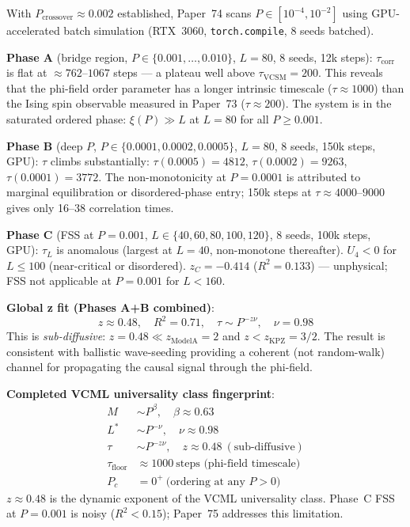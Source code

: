 \documentclass[11pt]{article}
\begin{document}
With $P_\mathrm{crossover}\approx0.002$ established, Paper~74 scans $P\in[10^{-4},10^{-2}]$
using GPU-accelerated batch simulation (RTX~3060, \texttt{torch.compile}, 8 seeds batched).

\textbf{Phase A} (bridge region, $P\in\{0.001,\ldots,0.010\}$, $L{=}80$, 8 seeds, 12k steps):
$\tau_\mathrm{corr}$ is flat at $\approx762$--$1067$ steps --- a plateau well above
$\tau_\mathrm{VCSM}=200$.
This reveals that the phi-field order parameter has a longer intrinsic timescale
($\tau\approx1000$) than the Ising spin observable measured in Paper~73 ($\tau\approx200$).
The system is in the saturated ordered phase: $\xi(P)\gg L$ at $L=80$ for all
$P\geq0.001$.

\textbf{Phase B} (deep $P$, $P\in\{0.0001,0.0002,0.0005\}$, $L{=}80$, 8 seeds, 150k steps, GPU):
$\tau$ climbs substantially: $\tau(0.0005)=4812$, $\tau(0.0002)=9263$, $\tau(0.0001)=3772$.
The non-monotonicity at $P=0.0001$ is attributed to marginal equilibration or disordered-phase
entry; 150k steps at $\tau\approx4000$--$9000$ gives only 16--38 correlation times.

\textbf{Phase C} (FSS at $P{=}0.001$, $L\in\{40,60,80,100,120\}$, 8 seeds, 100k steps, GPU):
$\tau_L$ is anomalous (largest at $L=40$, non-monotone thereafter).
$U_4<0$ for $L\leq100$ (near-critical or disordered).
$z_C=-0.414$ ($R^2=0.133$) --- unphysical; FSS not applicable at $P=0.001$ for $L<160$.

\textbf{Global z fit (Phases A+B combined)}:
\begin{equation}
  \boxed{z \approx 0.48,\quad R^2=0.71,\quad \tau\sim P^{-z\nu},\quad\nu=0.98}
  \label{eq:p74z}
\end{equation}
This is \emph{sub-diffusive}: $z=0.48\ll z_\mathrm{ModelA}=2$ and $z<z_\mathrm{KPZ}=3/2$.
The result is consistent with ballistic wave-seeding providing a coherent (not random-walk)
channel for propagating the causal signal through the phi-field.

\textbf{Completed VCML universality class fingerprint}:
\begin{align*}
  M   &\sim P^\beta,\quad\beta\approx0.63 \\
  L^* &\sim P^{-\nu},\quad\nu\approx0.98 \\
  \tau &\sim P^{-z\nu},\quad z\approx0.48\ (\text{sub-diffusive}) \\
  \tau_\mathrm{floor} &\approx1000\ \text{steps (phi-field timescale)} \\
  P_c &= 0^+\ \text{(ordering at any }P>0)
\end{align*}
$z\approx0.48$ is the dynamic exponent of the VCML universality class.
Phase~C FSS at $P=0.001$ is noisy ($R^2<0.15$); Paper~75 addresses this limitation.
\end{document}
